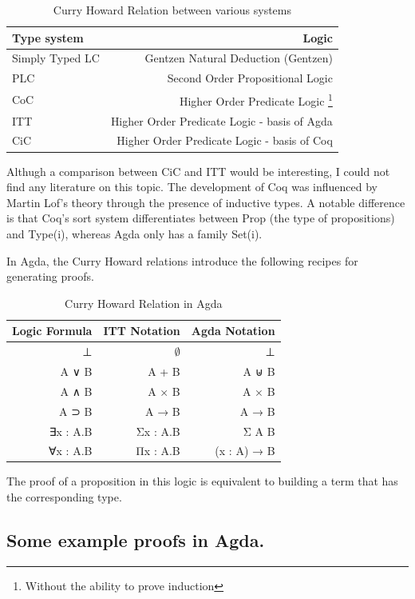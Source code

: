 \documentclass[12pt,twoside,notitlepage]{report}
\begin{document}
\begin{table}[h!]
\centering 
	\begin{tabular}{l r} 
	\hline
	Type system & Logic \\
	\hline 
	Simply Typed LC  & Gentzen Natural Deduction (Gentzen) \\
	PLC & Second Order Propositional Logic \\
	CoC &  Higher Order Predicate Logic \footnote{Without the ability to prove induction} \\
	ITT & Higher Order Predicate Logic - basis of Agda \\ 
	CiC & Higher Order Predicate Logic - basis of Coq \\   
	\hline 
	\end{tabular}
\caption{Curry Howard Relation between various systems}
\end{table}

Althugh a comparison between CiC and ITT would be interesting, I could not find any literature on this topic. The development of Coq was influenced by Martin Lof’s theory through the presence of inductive types\cite{coq_inductive}. A notable difference is that Coq’s sort system differentiates between Prop (the type of propositions) and Type(i), whereas Agda only has a family Set(i).

In Agda, the Curry Howard relations introduce the following recipes for generating proofs.

\begin{table}[h!]
\centering
	\begin{tabular}{r r r} 
	\hline 
	Logic Formula & ITT Notation & Agda Notation \\
	\hline
	⊥  & $∅$  & ⊥ \\
	A ∨ B & A + B &   A ⊎ B \\
	A ∧ B & A × B &   A × B \\
	A ⊃ B & A → B &   A → B \\ 
	∃x : A.B & Σx : A.B & Σ A B \\
	∀x : A.B & Πx : A.B & (x : A) →  B\\ 
	\hline
	\end{tabular}
\caption{Curry Howard Relation in Agda}
\end{table} 

The proof of a proposition in this logic is equivalent to building a term that has the corresponding type.

\subsection{Some example proofs in Agda.}
\end{document}
